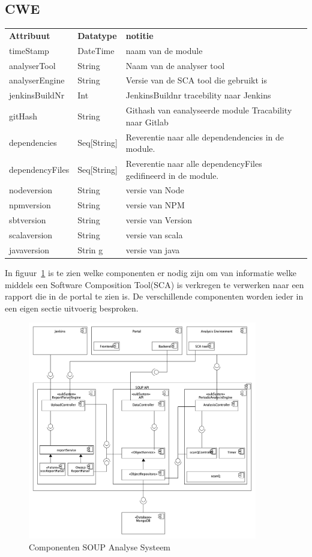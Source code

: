 \subsection{CWE}\label{subsec:cwe}

\begin{tabular}{lll}
    \textbf{Attribuut} & \textbf{Datatype} & \textbf{notitie}\\
    timeStamp & DateTime & naam van de module\\
    analyserTool & String & Naam van de analyser tool\\
    analyserEngine & String & Versie van de SCA tool die gebruikt is\\
    jenkinsBuildNr & Int & JenkinsBuildnr tracebility naar Jenkins\\
    gitHash & String & Githash van  eanalyseerde module Tracability naar Gitlab\\
    dependencies & Seq[String] & Reverentie naar alle dependendencies in de module.\\
    dependencyFiles & Seq[String] & Reverentie naar alle dependencyFiles gedifineerd in de module.\\
    nodeversion & String & versie van Node  \\
    npmversion & String & versie van NPM  \\
    sbtversion & String & versie van Version  \\
    scalaversion & String & versie van scala  \\
    javaversion & Strin g & versie van java \\
\end{tabular}


In figuur~\ref{fig:SOUP-Components} is te zien welke componenten er nodig zijn om van informatie welke middels een Software Composition Tool(SCA) is verkregen te verwerken naar een rapport die in de portal te zien is. De verschillende componenten worden ieder in een eigen sectie uitvoerig besproken.
\begin{figure}[bth]
    \myfloatalign
    \includegraphics[width=10cm]{gfx/umlet/exports/ApplicationComponents}
    \caption{Componenten SOUP Analyse Systeem}
    \label{fig:SOUP-Components}
\end{figure}

